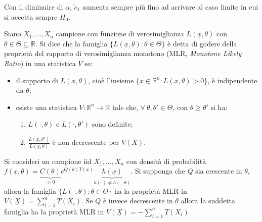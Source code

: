 \documentclass[hidelinks, 10pt]{report}
\begin{document}
\begin{oss}
Con il diminuire di $ \alpha $, $ \tilde{c}_{1} $ aumenta sempre pi\`u fino ad arrivare al caso limite in cui si accetta sempre $ H_{0} $.
\end{oss}

\begin{defn}
Siano $ X_{1}, \dotsc, X_{n} $ campione con funzione di verosimiglianza $ L(\underline{x}, \theta) $ con $ \theta \in \Theta \subseteq \mathbb{R} $. Si dice che la famiglia $ \{ L(\underline{x}, \theta) : \theta \in \Theta \} $ \`e detta di godere della propriet\`a del rapporto di verosimiglianza monotono (MLR, \emph{Monotone Likely Ratio}) in una statistica $ V $ se:
\begin{itemize}
\item il supporto di $ L(\overline{x}, \theta) $, cio\`e l'insieme $ \{ \underline{x} \in \mathbb{R}^{n} : L(\underline{x}, \theta) > 0 \} $, \`e indipendente da $ \theta $;
\item esiste una statistica $ V : \mathbb{R}^{n} \to \mathbb{R} $ tale che, $ \forall\ \theta, \theta' \in \Theta $, con $ \theta \ge \theta' $ si ha:
\begin{enumerate}
\item $ L(\cdot, \theta) $ e $ L(\cdot, \theta') $ sono definite;
\item $ \frac{L(\underline{x}, \theta')}{L(\underline{x}, \theta)} $ \`e non decrescente per $ V(\underline{X}) $.
\end{enumerate}
\end{itemize}
\end{defn}

\begin{prop}
Si consideri un campione iid $ X_{1}, \dotsc, X_{n} $ con densit\`a di probabilit\`a $ f(\underline{x}, \theta) = \underbrace{C(\theta)}_{> 0} e^{Q(\theta) T(\underline{x})} \underbrace{h(\underline{x})}_{h(\cdot) \ne h(\cdot, \theta)} $. Si supponga che $ Q $ sia crescente in $ \theta $, allora la famiglia $ \{ L(\cdot, \theta) : \theta \in \Theta \} $ ha la propriet\`a MLR in $ V(\underline{X}) = \sum\limits_{i = 1}^{n} T(X_{i}) $. Se $ Q $ \`e invece decrescente in $ \theta $ allora la suddetta famiglia ha la propriet\`a MLR in $ V(\underline{X}) = - \sum\limits_{i = 1}^{n} T(X_{i}) $.
\end{prop}
\end{document}

